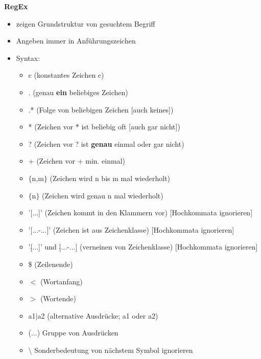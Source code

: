 \documentclass[12pt,utf8, 10pt]{article}
\begin{document}
\textbf{RegEx}
\begin{itemize}
	\item zeigen Grundstruktur von gesuchtem Begriff
	\item Angeben immer in Anführungszeichen
	\item Syntax:
	\begin{itemize}
		\item c (konstantes Zeichen c)
		\item . (genau \textbf{ein} beliebiges Zeichen)
		\item .* (Folge von beliebigen Zeichen [auch keines])
		\item * (Zeichen vor * ist beliebig oft [auch gar nicht])
		\item ? (Zeichen vor ? ist \textbf{genau} einmal oder gar nicht)
		\item + (Zeichen vor + min. einmal)
		\item $\{$n,m$\}$ (Zeichen wird n bis m mal wiederholt)
		\item $\{$n$\}$ (Zeichen wird genau n mal wiederholt)
		\item '[...]' (Zeichen kommt in den Klammern vor) [Hochkommata ignorieren]
		\item '[...-...]' (Zeichen ist aus Zeichenklasse) [Hochkommata ignorieren]
		\item '[$\hat{}$...]' und [$\hat{}$...-...] (verneinen von Zeichenklasse) [Hochkommata ignorieren]
		\item \$ (Zeilenende)
		\item $<$ (Wortanfang)
		\item $>$ (Wortende)
		\item a1$\mid$a2 (alternative Ausdrücke; a1 oder a2)
		\item (...) Gruppe von Ausdrücken
		\item $\setminus$ Sonderbedeutung von nächstem Symbol ignorieren
	\end{itemize}
\end{itemize}
\end{document}
